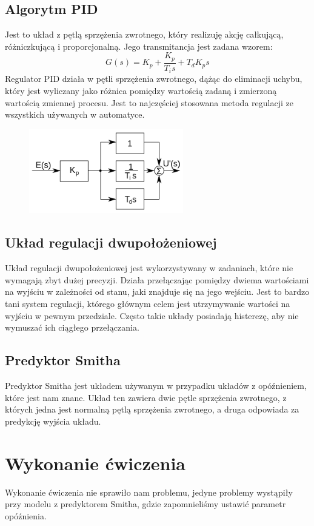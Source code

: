 \documentclass[a4paper]{article}
\begin{document}
		\subsection{Algorytm PID}
			Jest to układ z pętlą sprzężenia zwrotnego, który realizuję akcję całkującą, różniczkującą i proporcjonalną. Jego transmitancja jest zadana wzorem:
			$$
				G(s) = K_p + \frac{K_p}{T_is} + T_d K_p s
			$$
			Regulator PID działa w pętli sprzężenia zwrotnego, dążąc do eliminacji uchybu, który jest wyliczany jako różnica pomiędzy wartością zadaną i zmierzoną wartością zmiennej procesu. Jest to najczęściej stosowana metoda regulacji ze wszystkich używanych w automatyce. 
			\begin{figure}[H]
				\centering
				\includegraphics[width=0.6\textwidth]{./img/PID.png}
			\end{figure} 
		\subsection{Układ regulacji dwupołożeniowej}
			Układ regulacji dwupołożeniowej jest wykorzystywany w zadaniach, które nie wymagają zbyt dużej precyzji. Działa przełączając pomiędzy dwiema wartościami na wyjściu w zależności od stanu, jaki znajduje się na jego wejściu. Jest to bardzo tani system regulacji, którego głównym celem jest utrzymywanie wartości na wyjściu w pewnym przedziale. Często takie układy posiadają histerezę, aby nie wymuszać ich ciągłego przełączania. 
		\subsection{Predyktor Smitha}
			Predyktor Smitha jest układem używanym w przypadku układów z opóźnieniem, które jest nam znane. Układ ten zawiera dwie pętle sprzężenia zwrotnego, z których jedna jest normalną pętlą sprzężenia zwrotnego, a druga odpowiada za predykcję wyjścia układu.
	\section{Wykonanie ćwiczenia}
		Wykonanie ćwiczenia nie sprawiło nam problemu, jedyne problemy wystąpiły przy modelu z predyktorem Smitha, gdzie zapomnieliśmy ustawić parametr opóźnienia.
\end{document}
